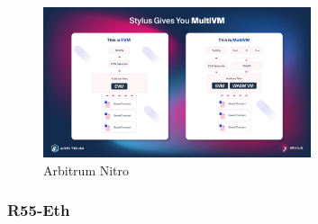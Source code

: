 \begin{figure}
    \centering
    \includegraphics[width=0.70\textwidth]{general-problems/assets/arbitrum-nitro.png}
    \caption{Arbitrum Nitro}
    \label{fig:arbitrum-nitro}
\end{figure}

\subsubsection{R55-Eth}
